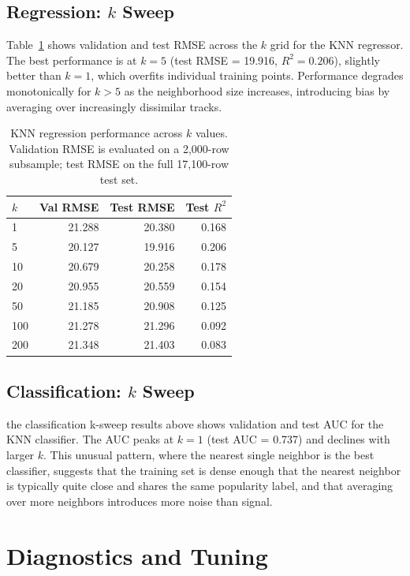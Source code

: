 \documentclass[12pt, oneside]{book}
\begin{document}
\subsection{Regression: $k$ Sweep}
 
Table~\ref{tab:ch11_reg_k} shows validation and test RMSE across the $k$ grid for the KNN regressor. The best performance is at $k = 5$ (test RMSE = 19.916, $R^2 = 0.206$), slightly better than $k = 1$, which overfits individual training points. Performance degrades monotonically for $k > 5$ as the neighborhood size increases, introducing bias by averaging over increasingly dissimilar tracks.
 
\begin{table}[H]
\centering
\caption{KNN regression performance across $k$ values. Validation RMSE is evaluated on a 2{,}000-row subsample; test RMSE on the full 17{,}100-row test set.}
\label{tab:ch11_reg_k}
\begin{tabular}{lrrr}
\toprule
\textbf{$k$} & \textbf{Val RMSE} & \textbf{Test RMSE} & \textbf{Test $R^2$} \\
\midrule
1   & 21.288 & 20.380 & 0.168 \\
5   & 20.127 & 19.916 & 0.206 \\
10  & 20.679 & 20.258 & 0.178 \\
20  & 20.955 & 20.559 & 0.154 \\
50  & 21.185 & 20.908 & 0.125 \\
100 & 21.278 & 21.296 & 0.092 \\
200 & 21.348 & 21.403 & 0.083 \\
\bottomrule
\end{tabular}
\end{table}
 
\subsection{Classification: $k$ Sweep}
 
the classification k-sweep results above shows validation and test AUC for the KNN classifier. The AUC peaks at $k = 1$ (test AUC = 0.737) and declines with larger $k$. This unusual pattern, where the nearest single neighbor is the best classifier, suggests that the training set is dense enough that the nearest neighbor is typically quite close and shares the same popularity label, and that averaging over more neighbors introduces more noise than signal.
 
 
\section{Diagnostics and Tuning}
 
\end{document}
